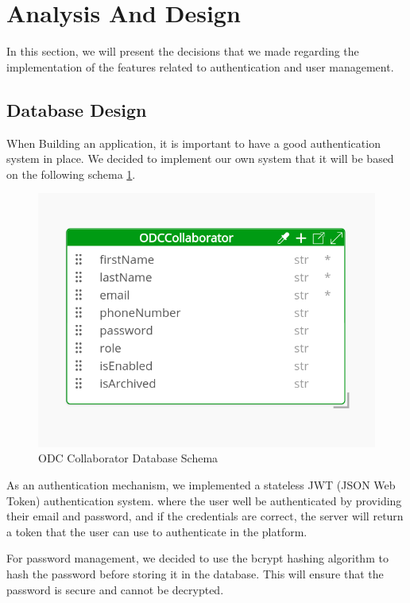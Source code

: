 \section{Analysis And Design}
In this section, we will present the decisions that we made regarding the implementation
of the features related to authentication and user management.

\subsection{Database Design}
When Building an application, it is important to have a good authentication system in place.
We decided to implement our own system that it will be based on the following schema \ref{fig:Database Schema}.

\begin{figure}[h!]
    \centering
    \includegraphics[width=1\textwidth]{images/diagram-ODCCollaborator.png}
    \caption{ODC Collaborator Database Schema}
    \label{fig:Database Schema}
\end{figure}

As an authentication mechanism, we implemented a stateless JWT (JSON Web Token) authentication system.
where the user well be authenticated by providing their email and password, and if the credentials are correct,
the server will return a token that the user can use to authenticate in the platform.

For password management, we decided to use the bcrypt hashing algorithm to hash the password before storing it in the database.
This will ensure that the password is secure and cannot be decrypted.

